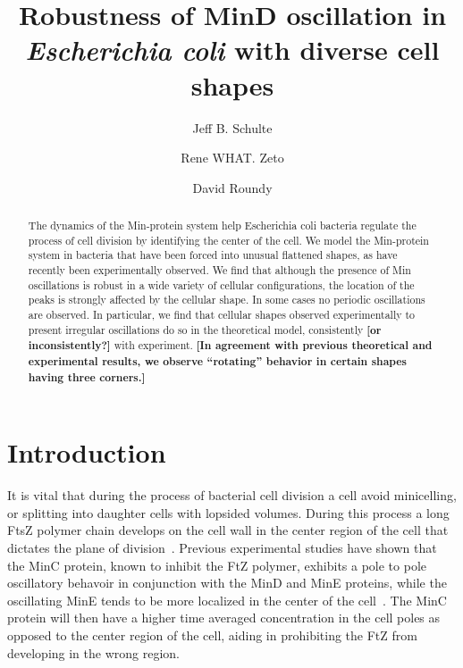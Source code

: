 \documentclass[letterpaper,twocolumn,amsmath,amssymb,pre]{revtex4-1}
\newcommand{\red}[1]{{\bf \color{red} #1}}
\newcommand{\fixme}[1]{\red{[#1]}}
\begin{document}
\title{Robustness of MinD oscillation in \emph{Escherichia coli} with
  diverse cell shapes}

\author{Jeff B. Schulte}
\author{Rene WHAT. Zeto}
\author{David Roundy}

\begin{abstract}
  The dynamics of the Min-protein system help Escherichia coli
  bacteria regulate the process of cell division by identifying the
  center of the cell.  We model the Min-protein system in bacteria
  that have been forced into unusual flattened shapes, as have
  recently been experimentally observed.  We find that although the
  presence of Min oscillations is robust in a wide variety of cellular
  configurations, the location of the peaks is strongly affected by
  the cellular shape.  In some cases no periodic oscillations are
  observed.  In particular, we find that cellular shapes observed
  experimentally to present irregular oscillations do so in the
  theoretical model, consistently \fixme{or inconsistently?} with
  experiment.  \fixme{In agreement with previous theoretical and
    experimental results, we observe ``rotating'' behavior in certain
    shapes having three corners.}
\end{abstract}

\maketitle

\section{Introduction}
It is vital that during the process of bacterial cell division a cell
avoid minicelling, or splitting into daughter cells with lopsided
volumes.  During this process a long FtsZ polymer chain develops on
the cell wall in the center region of the cell that dictates the plane
of division~\cite{adams2009bacterial,
  lutkenhaus2007assembly}. Previous experimental studies have shown
that the MinC protein, known to inhibit the FtZ
polymer\cite{shen2010examination}, exhibits a pole to pole oscillatory
behavoir in conjunction with the MinD and MinE proteins, while the
oscillating MinE tends to be more localized in the center of the
cell~\cite{hu1999topological, fu2001mine, shapiro2009and, yu1999ftsz,
  raskin1999rapid}. The MinC protein will then have a higher time
averaged concentration in the cell poles as opposed to the center
region of the cell, aiding in prohibiting the FtZ from developing in
the wrong region.
\end{document}
